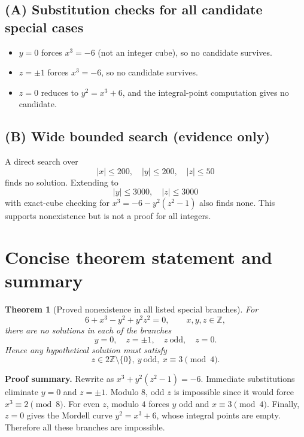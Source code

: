 \documentclass[11pt]{article}
\newtheorem{thm}{Theorem}
\begin{document}
\subsection*{(A) Substitution checks for all candidate special cases}
\begin{itemize}[leftmargin=2em]
\item $y=0$ forces $x^3=-6$ (not an integer cube), so no candidate survives.
\item $z=\pm1$ forces $x^3=-6$, so no candidate survives.
\item $z=0$ reduces to $y^2=x^3+6$, and the integral-point computation gives no candidate.
\end{itemize}

\subsection*{(B) Wide bounded search (evidence only)}
A direct search over
\[
|x|\le 200,\quad |y|\le 200,\quad |z|\le 50
\]
finds no solution. Extending to
\[
|y|\le 3000,\quad |z|\le 3000
\]
with exact-cube checking for $x^3=-6-y^2(z^2-1)$ also finds none.
This supports nonexistence but is not a proof for all integers.

\section*{Concise theorem statement and summary}

\begin{thm}[Proved nonexistence in all listed special branches]
For
\[
6+x^3-y^2+y^2z^2=0,\qquad x,y,z\in\mathbb Z,
\]
there are no solutions in each of the branches
\[
y=0,\quad z=\pm1,\quad z\ \text{odd},\quad z=0.
\]
Hence any hypothetical solution must satisfy
\[
z\in2\mathbb Z\setminus\{0\},\ y\ \text{odd},\ x\equiv3\pmod4.
\]
\end{thm}

\noindent\textbf{Proof summary.}
Rewrite as $x^3+y^2(z^2-1)=-6$. Immediate substitutions eliminate
$y=0$ and $z=\pm1$. Modulo $8$, odd $z$ is impossible since it would force
$x^3\equiv2\pmod8$. For even $z$, modulo $4$ forces $y$ odd and $x\equiv3\pmod4$.
Finally, $z=0$ gives the Mordell curve $y^2=x^3+6$, whose integral points are empty.
Therefore all these branches are impossible.
\end{document}
